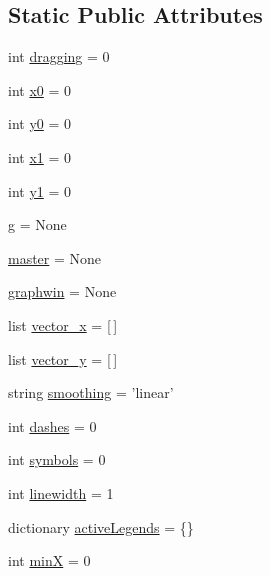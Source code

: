 \subsection*{Static Public Attributes}
\begin{CompactItemize}
\item 
int \hyperlink{classdisplayGraph_1_1GraphDisplay_94f44c31c345d1e6cc7bf065eadc0930}{dragging} = 0
\item 
int \hyperlink{classdisplayGraph_1_1GraphDisplay_f674fd8b07629a888c1168140d932ef5}{x0} = 0
\item 
int \hyperlink{classdisplayGraph_1_1GraphDisplay_161afe1faeb9fe388540988b38cc9d36}{y0} = 0
\item 
int \hyperlink{classdisplayGraph_1_1GraphDisplay_850f6b2ea73d56860d577340250e798b}{x1} = 0
\item 
int \hyperlink{classdisplayGraph_1_1GraphDisplay_5bc79a402026c10d1a885268f367da6f}{y1} = 0
\item 
\hyperlink{classdisplayGraph_1_1GraphDisplay_bd81da31cf27c7184595c8fc2f1ac03b}{g} = None
\item 
\hyperlink{classdisplayGraph_1_1GraphDisplay_da366103f666f1d0e14675774248199c}{master} = None
\item 
\hyperlink{classdisplayGraph_1_1GraphDisplay_017a3d783a77329a012d81dfca0e367f}{graphwin} = None
\item 
list \hyperlink{classdisplayGraph_1_1GraphDisplay_13ced5ed39be53fe07069ff968b0d39a}{vector\_\-x} = \mbox{[}$\,$\mbox{]}
\item 
list \hyperlink{classdisplayGraph_1_1GraphDisplay_1c7b201d4525cdcb1fbbbbbb235b3378}{vector\_\-y} = \mbox{[}$\,$\mbox{]}
\item 
string \hyperlink{classdisplayGraph_1_1GraphDisplay_f5bb96a64574212431ce41da447b9c76}{smoothing} = 'linear'
\item 
int \hyperlink{classdisplayGraph_1_1GraphDisplay_853bfc417b99817b32dd3ca8c1a6d578}{dashes} = 0
\item 
int \hyperlink{classdisplayGraph_1_1GraphDisplay_27684b2cab401e558887aadaf8db8ac9}{symbols} = 0
\item 
int \hyperlink{classdisplayGraph_1_1GraphDisplay_620a2ba629d0277b485e026bcacd8276}{linewidth} = 1
\item 
dictionary \hyperlink{classdisplayGraph_1_1GraphDisplay_168825ac8fb8ffcb32e785b7798e64ba}{activeLegends} = \{\}
\item 
int \hyperlink{classdisplayGraph_1_1GraphDisplay_5d057d752da83763c88a66a1c7f7e858}{minX} = 0
\end{CompactItemize}


